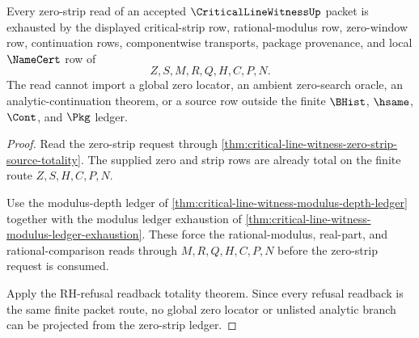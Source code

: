 \begin{theorem}
\label{thm:critical-line-witness-zero-strip-ledger-exhaustion}
Every zero-strip read of an accepted $\CriticalLineWitnessUp$ packet is exhausted by the displayed critical-strip row, rational-modulus row, zero-window row, continuation rows, componentwise transports, package provenance, and local $\NameCert$ row of
$$
Z,S,M,R,Q,H,C,P,N.
$$
The read cannot import a global zero locator, an ambient zero-search oracle, an analytic-continuation theorem, or a source row outside the finite $\BHist$, $\hsame$, $\Cont$, and $\Pkg$ ledger.
\end{theorem}
\begin{proof}
Read the zero-strip request through \autoref{thm:critical-line-witness-zero-strip-source-totality}. The supplied zero and strip rows are already total on the finite route $Z,S,H,C,P,N$.

Use the modulus-depth ledger of \autoref{thm:critical-line-witness-modulus-depth-ledger} together with the modulus ledger exhaustion of \autoref{thm:critical-line-witness-modulus-ledger-exhaustion}. These force the rational-modulus, real-part, and rational-comparison reads through $M,R,Q,H,C,P,N$ before the zero-strip request is consumed.

Apply the RH-refusal readback totality theorem. Since every refusal readback is the same finite packet route, no global zero locator or unlisted analytic branch can be projected from the zero-strip ledger.
\end{proof}

